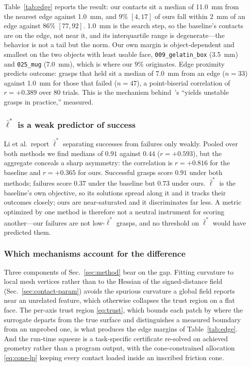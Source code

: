 Table~\ref{tab:edge} reports the result: our contacts sit a median of
\SI{11.0}{\milli\meter} from the nearest edge against \SI{1.0}{\milli\meter}, and
$9\%$ $[4,17]$ of ours fall within \SI{2}{\milli\meter} of an edge against $86\%$
$[77,92]$. \SI{1.0}{\milli\meter} is the search step, so the baseline's contacts are
on the edge, not near it, and its interquartile range is degenerate---the behavior is
not a tail but the norm. Our own margin is object-dependent and smallest on the two
objects with least usable face, \texttt{009\_gelatin\_box}
(\SI{3.5}{\milli\meter}) and \texttt{025\_mug} (\SI{7.0}{\milli\meter}), which
is where our $9\%$ originates. Edge proximity predicts outcome: grasps that held sit
a median of \SI{7.0}{\milli\meter} from an edge ($n=33$) against
\SI{1.0}{\milli\meter} for those that failed ($n=47$), a point-biserial correlation
of $r = +0.389$ over 80 trials. This is the mechanism
behind~\cite{li2023frogger}'s ``yields unstable grasps in practice,'' measured.

\subsubsection{$\bar{\ell}^*$ is a weak predictor of success}

Li et al.\ report $\bar{\ell}^*$ separating successes from failures only weakly.
Pooled over both methods we find medians of $0.91$ against $0.44$
($r = +0.593$), but the aggregate conceals a sharp asymmetry: the correlation is
$r = +0.816$ for the baseline and $r = +0.365$ for ours. Successful grasps score
$0.91$ under both methods; failures score $0.37$ under the baseline but $0.73$ under
ours. $\bar{\ell}^*$ is the baseline's own objective, so its solutions spread along
it and it tracks their outcomes closely; ours are near-saturated and it discriminates
far less. A metric optimized by one method is therefore not a neutral instrument for
scoring another---our failures are not low-$\bar{\ell}^*$ grasps, and no threshold on
$\bar{\ell}^*$ would have predicted them.

\subsubsection{Which mechanisms account for the difference}

Three components of Sec.~\ref{sec:method} bear on the gap. Fitting curvature to local
mesh vertices rather than to the Hessian of the signed-distance field
(Sec.~\ref{sec:contact-param}) avoids the spurious curvature a global field reports
near an unrelated feature, which otherwise collapses the trust region on a flat face.
The per-axis trust region \eqref{eq:trust}, which bounds each patch by where the
surrogate departs from the true surface and distinguishes a measured boundary from an
unprobed one, is what produces the edge margins of Table~\ref{tab:edge}. And the
run-time squeeze is a task-specific certificate re-solved on achieved geometry rather
than a program output, with the cone-constrained allocation \eqref{eq:cone-lp} keeping
every contact loaded inside an inscribed friction cone.

